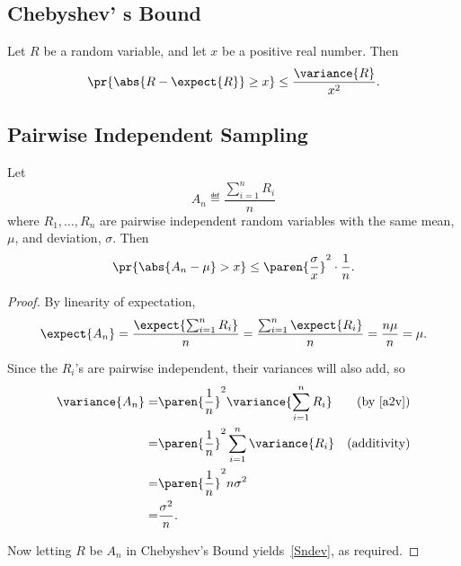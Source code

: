 \documentclass[handout]{mcs}
\begin{document}
{%

\subsection*{Chebyshev' s Bound}
Let $R$ be a random variable, and let $x$ be a positive real number.
Then
\[
\pr{\abs{R - \expect{R}} \geq x} \leq \frac{\variance{R}}{x^2}.
\]

\subsection*{Pairwise Independent Sampling}

\begin{theorem*}
Let
\[
A_n \eqdef \frac{\sum_{i=1}^n R_i}{n}
\]
where $R_1, \dots, R_n$ are pairwise independent random variables with the
same mean, $\mu$, and deviation, $\sigma$.  Then
\begin{equation}\label{Sndev}
\pr{\abs{A_n - \mu} > x} \leq 
\paren{\frac{\sigma}{x}}^2 \cdot \frac{1}{n}.
\end{equation}
\end{theorem*}

\begin{proof}
By linearity of expectation,
\[
\expect{A_n} = \frac{\expect{\sum_{i=1}^n R_i}}{n}
   = \frac{\sum_{i=1}^n \expect{R_i}}{n}
   = \frac{n\mu}{n} = \mu.
\]

Since the $R_i$'s are pairwise independent, their variances will also add,
so
\begin{align*}
\variance{A_n}  = & \paren{\frac{1}{n}}^2 \variance{\sum_{i=1}^n R_i}
                        & \text{(by~\eqref{a2v})}\\
 = & \paren{\frac{1}{n}}^2 \sum_{i=1}^n \variance{R_i}
                        & \text{(additivity)}\\
 = & \paren{\frac{1}{n}}^2 n\sigma^2\\
 = & \frac{\sigma^2}{n}.
\end{align*}

Now letting $R$ be $A_n$ in Chebyshev's Bound
yields~\eqref{Sndev}, as required.

\end{proof}
}
\end{document}
